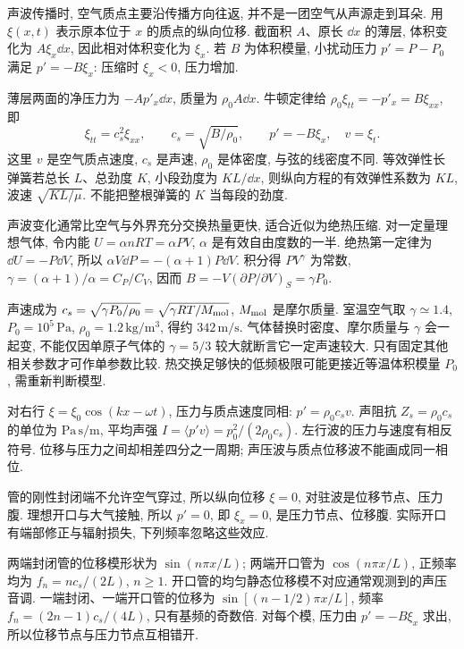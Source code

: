 \label{ch:sound}
声波传播时, 空气质点主要沿传播方向往返, 并不是一团空气从声源走到耳朵. 用 $\xi(x,t)$ 表示原本位于 $x$ 的质点的纵向位移. 截面积 $A$、原长 $\dd x$ 的薄层, 体积变化为 $A\xi_x\dd x$, 因此相对体积变化为 $\xi_x$. 若 $B$ 为体积模量, 小扰动压力 $p'=P-P_0$ 满足 $p'=-B\xi_x$: 压缩时 $\xi_x<0$, 压力增加.

薄层两面的净压力为 $-A p'_x\dd x$, 质量为 $\rho_0A\dd x$. 牛顿定律给 $\rho_0\xi_{tt}=-p'_x=B\xi_{xx}$, 即
\[
\xi_{tt}=c_s^2\xi_{xx},\qquad c_s=\sqrt{B/\rho_0},\qquad
p'=-B\xi_x,\quad v=\xi_t.
\]
这里 $v$ 是空气质点速度, $c_s$ 是声速, $\rho_0$ 是体密度, 与弦的线密度不同. 等效弹性长弹簧若总长 $L$、总劲度 $K$, 小段劲度为 $KL/\dd x$, 则纵向方程的有效弹性系数为 $KL$, 波速 $\sqrt{KL/\mu}$. 不能把整根弹簧的 $K$ 当每段的劲度.

声波变化通常比空气与外界充分交换热量更快, 适合近似为绝热压缩. 对一定量理想气体, 令内能 $U=\alpha nRT=\alpha PV$, $\alpha$ 是有效自由度数的一半. 绝热第一定律为 $\dd U=-P\dd V$, 所以 $\alpha V\dd P=-(\alpha+1)P\dd V$. 积分得 $PV^\gamma$ 为常数, $\gamma=(\alpha+1)/\alpha=C_P/C_V$, 因而 $B=-V(\partial P/\partial V)_S=\gamma P_0$.

声速成为 $c_s=\sqrt{\gamma P_0/\rho_0}=\sqrt{\gamma RT/M_{\rm mol}}$, $M_{\rm mol}$ 是摩尔质量. 室温空气取 $\gamma\simeq1.4$, $P_0=10^5\,\mathrm{Pa}$, $\rho_0=1.2\,\mathrm{kg/m^3}$, 得约 $342\,\mathrm{m/s}$. 气体替换时密度、摩尔质量与 $\gamma$ 会一起变, 不能仅因单原子气体的 $\gamma=5/3$ 较大就断言它一定声速较大. 只有固定其他相关参数才可作单参数比较. 热交换足够快的低频极限可能更接近等温体积模量 $P_0$, 需重新判断模型.

对右行 $\xi=\xi_0\cos(kx-\omega t)$, 压力与质点速度同相: $p'=\rho_0 c_s v$. 声阻抗 $Z_s=\rho_0c_s$ 的单位为 $\mathrm{Pa\,s/m}$, 平均声强 $I=\langle p'v\rangle=p_0^2/(2\rho_0c_s)$. 左行波的压力与速度有相反符号. 位移与压力之间却相差四分之一周期; 声压波与质点位移波不能画成同一相位.

管的刚性封闭端不允许空气穿过, 所以纵向位移 $\xi=0$, 对驻波是位移节点、压力腹. 理想开口与大气接触, 所以 $p'=0$, 即 $\xi_x=0$, 是压力节点、位移腹. 实际开口有端部修正与辐射损失, 下列频率忽略这些效应.

两端封闭管的位移模形状为 $\sin(n\pi x/L)$; 两端开口管为 $\cos(n\pi x/L)$, 正频率均为 $f_n=nc_s/(2L)$, $n\ge1$. 开口管的均匀静态位移模不对应通常观测到的声压音调. 一端封闭、一端开口管的位移为 $\sin[(n-1/2)\pi x/L]$, 频率 $f_n=(2n-1)c_s/(4L)$, 只有基频的奇数倍. 对每个模, 压力由 $p'=-B\xi_x$ 求出, 所以位移节点与压力节点互相错开.

